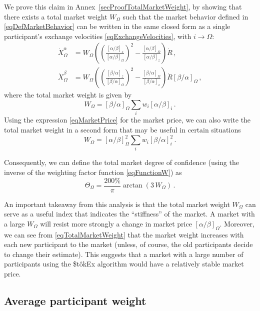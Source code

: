\documentclass[letterpaper]{article}
\newcommand{\priceAB}{\left[\alpha / \beta\right]}
\newcommand{\priceBA}{\left[\beta / \alpha\right]}
\newcommand{\StokEx}{\$t\^{o}kEx}
\begin{document}
We prove this claim in Annex~\ref{secProofTotalMarketWeight}, by showing that there exists a total market weight $W_\Omega$ such that the market behavior defined in \eqref{eqDefMarketBehavior} can be written in the same closed form as a single participant's exchange velocities \eqref{eqExchangeVelocities}, with $i \to \Omega$:
\begin{align}
    \dot{X}_\Omega^\alpha &= W_\Omega \left(\left(\frac{\priceAB_z}{\priceAB_\Omega}\right)^2-\frac{\priceAB_\Omega}{\priceAB_z}\right) \dot{R} \,, \nonumber\\
    \dot{X}_\Omega^\beta &= W_\Omega \left(\left(\frac{\priceBA_z}{\priceBA_\Omega}\right)^2-\frac{\priceBA_\Omega}{\priceBA_z}\right) \dot{R} \priceBA_\Omega \,, \label{eqMarketBehavior}
\end{align}
where the total market weight is given by
\begin{equation}
   W_\Omega = \priceBA_\Omega \sum_i w_i \priceAB_i\,. \label{eqTotalMarketWeight}
\end{equation}
Using the expression \eqref{eqMarketPrice} for the market price, we can also write the total market weight in a second form that may be useful in certain situations
\begin{equation}
   W_\Omega = \priceAB_\Omega^2 \sum_i w_i \priceBA_i^2\,. \label{eqTotalMarketWeight2}
\end{equation}

Consequently, we can define the total market degree of confidence (using the inverse of the weighting factor function \eqref{eqFunctionW}) as
\begin{equation}
   \Theta_\Omega = \frac{200\%}{\pi} \arctan \left( 3 \, W_\Omega\right) \,. \label{eqTotalMarketDegree}
\end{equation}

An important takeaway from this analysis is that the total market weight $W_\Omega$ can serve as a useful index that indicates the ``stiffness'' of the market. A market with a large $W_\Omega$ will resist more strongly a change in market price $\priceAB_\Omega$. Moreover, we can see from \eqref{eqTotalMarketWeight} that the market weight increases with each new participant to the market (unless, of course, the old participants decide to change their estimate). This suggests that a market with a large number of participants using the \StokEx{} algorithm would have a relatively stable market price.

\subsection{Average participant weight}
\end{document}
